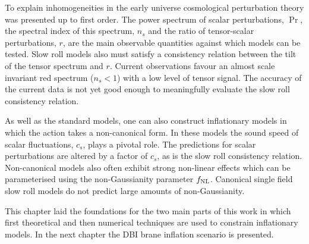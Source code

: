 To explain inhomogeneities in the early universe cosmological perturbation theory was presented up
to first order. The power spectrum of scalar perturbations, $\Pr$, the spectral index of this
spectrum, $n_s$ and the ratio of tensor-scalar perturbations, $r$, are the main observable
quantities against which models can be tested. Slow roll models also must satisfy a consistency
relation between the tilt of the tensor spectrum and $r$. Current observations favour an almost
scale invariant red spectrum ($n_s<1$) with a low level of tensor signal. The accuracy of the
current data is not yet good enough to meaningfully evaluate the slow roll consistency relation. 

As well as the standard models, one can also construct inflationary models in which the action
takes a non-canonical form. In these models the sound speed of scalar fluctuations, $c_s$, plays a
pivotal role. The predictions for scalar perturbations are altered by a factor of $c_s$, as is the
slow roll consistency relation. Non-canonical models also often exhibit strong non-linear effects
which can be parameterised using the non-Gaussianity parameter $f_{\mathrm{NL}}$. Canonical single field slow
roll models do not predict large amounts of non-Gaussianity. 

This chapter laid the foundations for the two main parts of this work in which first theoretical
and then numerical techniques are used to constrain inflationary models. In the next chapter the
DBI brane inflation scenario is presented. 

